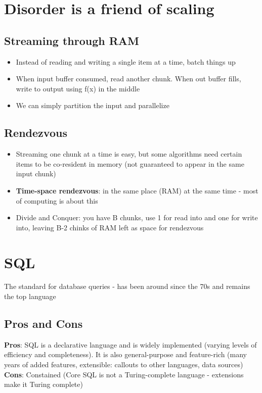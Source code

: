 \documentclass{article}
\begin{document}
\section{Disorder is a friend of scaling}

\subsection{Streaming through RAM}
\begin{itemize}
\item Instead of reading and writing a single item at a time, batch things up
\item When input buffer consumed, read another chunk. When out buffer fills, write to output using f(x) in the middle
\item We can simply partition the input and parallelize
\end{itemize}

\subsection{Rendezvous}
\begin{itemize}
\item Streaming one chunk at a time is easy, but some algorithms need certain items to be co-resident in memory (not guaranteed to appear in the same input chunk)
\item \textbf{Time-space rendezvous}: in the same place (RAM) at the same time - most of computing is about this
\item Divide and Conquer: you have B chunks, use 1 for read into and one for write into, leaving B-2 chinks of RAM left as space for rendezvous
\end{itemize}

\section{SQL}
The standard for database queries - has been around since the 70s and remains the top language
\subsection{Pros and Cons}
\textbf{Pros}: SQL is a declarative language and is widely implemented (varying levels of efficiency and completeness). It is also general-purpose and feature-rich (many years of added features, extensible: callouts to other languages, data sources) \\ 
\textbf{Cons}: Constained (Core SQL is not a Turing-complete language - extensions make it Turing complete) 
\end{document}
